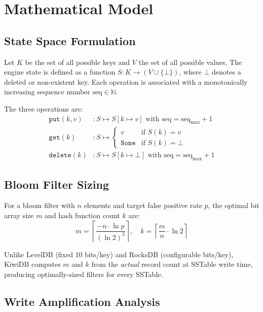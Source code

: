 \documentclass[oneside,a4paper,12pt]{book}
\begin{document}
\section{Mathematical Model}

\subsection{State Space Formulation}

Let $K$ be the set of all possible keys and $V$ the set of all possible values. The engine state is defined as a function $S: K \rightarrow (V \cup \{\bot\})$, where $\bot$ denotes a deleted or non-existent key. Each operation is associated with a monotonically increasing sequence number $\text{seq} \in \mathbb{N}$.

The three operations are:
\begin{align}
\texttt{put}(k, v) &: S \mapsto S[k \mapsto v] \text{ with } \text{seq} = \text{seq}_{\max} + 1 \\
\texttt{get}(k) &: S \mapsto \begin{cases} v & \text{if } S(k) = v \\ \texttt{None} & \text{if } S(k) = \bot \end{cases} \\
\texttt{delete}(k) &: S \mapsto S[k \mapsto \bot] \text{ with } \text{seq} = \text{seq}_{\max} + 1
\end{align}

\subsection{Bloom Filter Sizing}

For a bloom filter with $n$ elements and target false positive rate $p$, the optimal bit array size $m$ and hash function count $k$ are:
\begin{equation}
m = \left\lceil \frac{-n \cdot \ln p}{(\ln 2)^2} \right\rceil, \quad
k = \left\lceil \frac{m}{n} \cdot \ln 2 \right\rceil
\end{equation}

Unlike LevelDB (fixed 10 bits/key) and RocksDB (configurable bits/key), KiwiDB computes $m$ and $k$ from the \emph{actual} record count at SSTable write time, producing optimally-sized filters for every SSTable.

\subsection{Write Amplification Analysis}
\end{document}
